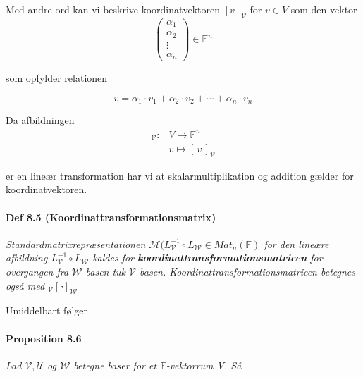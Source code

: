\documentclass[paper=a4, fontsize=11pt]{scrartcl} %
\begin{document}
	Med andre ord kan vi beskrive koordinatvektoren $[v]_{\mathcal{V}}$ for $v \in V$ som den vektor
	\[\begin{pmatrix}
	\alpha_1 \\
	\alpha_2 \\
	\vdots \\
	\alpha_n
	\end{pmatrix} \in \mathbb{F}^n \tag{8.8}
	\]
	
	som opfylder relationen
	
	\[v = \alpha_1 \cdot v_1 + \alpha_2 \cdot v_2 + \cdots + \alpha_n \cdot v_n \tag{8.9}\] 
	
	Da afbildningen
	\begin{align*}
	[\,\cdot\,]_{\mathcal{V}} : &V \rightarrow \mathbb{F}^n\\
	& v \mapsto [\,v\,]_{\mathcal{V}}
	\end{align*}
	
	er en lineær transformation har vi at skalarmultiplikation og addition gælder for koordinatvektoren.
	
	\paragraph{Def 8.5 (Koordinattransformationsmatrix)}
	
	\textit{Standardmatrixrepræsentationen $\mathcal{M}(L_{\mathcal{V}}^{-1} \circ L_{\mathcal{W}} \in Mat_n(\mathbb{F})$ for den lineære afbildning $L_{\mathcal{V}}^{-1} \circ L_{\mathcal{W}}$ kaldes for \textbf{koordinattransformationsmatricen} for overgangen fra $\mathcal{W}$-basen tuk $\mathcal{V}$-basen. Koordinattransformationsmatricen betegnes også med $_\mathcal{V}[{\scriptstyle\square}]_{\mathcal{W}}$}
	
	Umiddelbart følger
	
	\paragraph{Proposition 8.6} \textit{Lad $\mathcal{V}, \mathcal{U}$ og $\mathcal{W}$ betegne baser for et $\mathbb{F}$-vektorrum V. Så}
	
\end{document}
